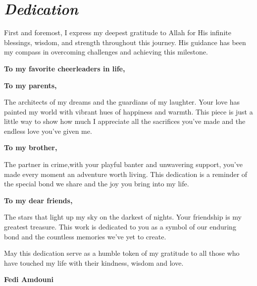 \chapter*{\textit{Dedication}}


\hspace*{\parindent}First and foremost, I express my deepest gratitude to Allah for His infinite blessings, wisdom, and strength throughout this journey. His guidance has been my compass in overcoming challenges and achieving this milestone.
\vspace{0.8cm}

\noindent\textbf{To my favorite cheerleaders in life,}

\vspace{0.6cm}

\noindent\textbf{To my parents,}

\vspace{0.2cm}
The architects of my dreams and the guardians of my laughter. Your love has painted my world with vibrant hues of happiness and warmth. This piece is just a little way to show how much I appreciate all the sacrifices you've made and the endless love you've given me.

\vspace{0.5cm}

\noindent\textbf{To my brother,}

\vspace{0.2cm}
The partner in crime,with your playful banter and unwavering support, you've made every moment an adventure worth living. This dedication is a reminder of the special bond we share and the joy you bring into my life.

\vspace{0.5cm}

\noindent\textbf{To my dear friends,}

\vspace{0.2cm}
The stars that light up my sky on the darkest of nights. Your friendship is my greatest treasure. This work is dedicated to you as a symbol of our enduring bond and the countless memories we've yet to create.

\vspace{0.6cm}

 May this dedication serve as a humble token of my gratitude to all those who have touched my life with their kindness, wisdom and love.

\vspace{2cm}
\large\hfill\textbf{Fedi Amdouni}
